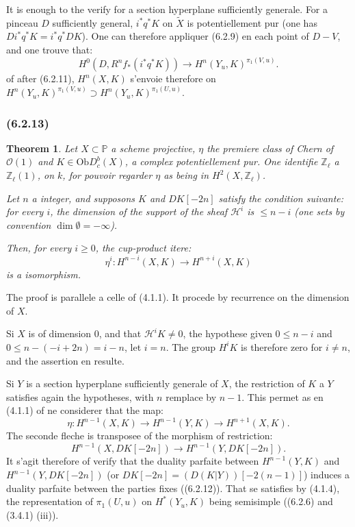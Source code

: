 \documentclass[12pt,a4paper]{article}
\theoremstyle{plain}
\newtheorem{theorem}{Theorem}[section]
\theoremstyle{definition}
\theoremstyle{remark}
\newcommand{\Ob}{\mathrm{Ob}}
\newcommand{\bbP}{\mathbb{P}}
\newcommand{\scrH}{\mathscr{H}}
\newcommand{\scrO}{\mathscr{O}}
\newcommand{\Zl}{\mathbb{Z}_\ell}
\begin{document}
It is enough to the verify for a section hyperplane sufficiently generale. For a pinceau $D$ sufficiently general, $i^* q^* K$ on $\widetilde{X}$ is potentiellement pur (one has $D i^* q^* K = i^* q^* DK$). One can therefore appliquer (6.2.9) en each point of $D - V$, and one trouve that:
\[
H^0(D, R^n f_* (i^* q^* K)) \to H^n(Y_u, K)^{\pi_1(V, u)}.
\]
of after (6.2.11), $H^n(X, K)$ s'envoie therefore on $H^n(Y_u, K)^{\pi_1(V, u)} \supset H^n(Y_u, K)^{\pi_1(U, u)}$.

\subsubsection*{\textup{(6.2.13)}}

\begin{theorem}
Let $X \subset \bbP$ a scheme projective, $\eta$ the premiere class of Chern of $\scrO(1)$ and $K \in \Ob D_c^b(X)$, a complex potentiellement pur. One identifie $\Zl$ a $\Zl(1)$, on $k$, for pouvoir regarder $\eta$ as being in $H^2(X, \Zl)$.

Let $n$ a integer, and supposons $K$ and $DK[-2n]$ satisfy the condition suivante: for every $i$, the dimension of the support of the sheaf $\scrH^i$ is $\leq n - i$ (one sets by convention $\dim \emptyset = -\infty$).

Then, for every $i \geq 0$, the cup-product itere:
\[
\eta^i : H^{n-i}(X, K) \to H^{n+i}(X, K)
\]
is a isomorphism.
\end{theorem}

The proof is parallele a celle of (4.1.1). It procede by recurrence on the dimension of $X$.

Si $X$ is of dimension $0$, and that $\scrH^i K \neq 0$, the hypothese given $0 \leq n - i$ and $0 \leq n - (-i + 2n) = i - n$, let $i = n$. The group $H^i K$ is therefore zero for $i \neq n$, and the assertion en resulte.

Si $Y$ is a section hyperplane sufficiently generale of $X$, the restriction of $K$ a $Y$ satisfies again the hypotheses, with $n$ remplace by $n-1$. This permet as en (4.1.1) of ne considerer that the map:
\[
\eta : H^{n-1}(X, K) \to H^{n-1}(Y, K) \to H^{n+1}(X, K).
\]
The seconde fleche is transposee of the morphism of restriction:
\[
H^{n-1}(X, DK[-2n]) \to H^{n-1}(Y, DK[-2n]).
\]
It s'agit therefore of verify that the duality parfaite between $H^{n-1}(Y, K)$ and $H^{n-1}(Y, DK[-2n])$ (or $DK[-2n] = (D(K|Y))[-2(n-1)]$) induces a duality parfaite between the parties fixes ((6.2.12)). That se satisfies by (4.1.4), the representation of $\pi_1(U, u)$ on $H^*(Y_u, K)$ being semisimple ((6.2.6) and (3.4.1) (iii)).
\end{document}
